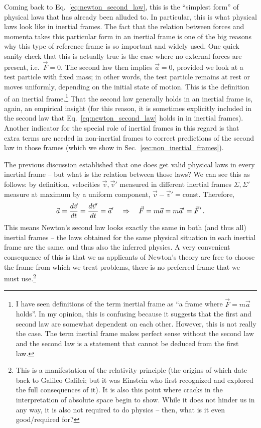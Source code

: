 \documentclass[../class_mech_main.tex]{subfiles}
\begin{document}
Coming back to Eq.~\eqref{eq:newton_second_law}, this is the \enquote{simplest form} of physical laws that has already been alluded to. In particular, this is what physical laws look like in inertial frames. The fact that the relation between forces and momenta takes this particular form in an inertial frame is one of the big reasons why this type of reference frame is so important and widely used. One quick sanity check that this is actually true is the case where no external forces are present, i.e.~$\vec{F} = 0$. The second law then implies $\vec{a} = 0$, provided we look at a test particle with fixed mass; in other words, the test particle remains at rest or moves uniformly, depending on the initial state of motion. This is the definition of an inertial frame.\footnote{I have seen definitions of the term inertial frame as \enquote{a frame where $\vec{F} = m \vec{a}$ holds}. In my opinion, this is confusing because it suggests that the first and second law are somewhat dependent on each other. However, this is not really the case. The term inertial frame makes perfect sense without the second law and the second law is a statement that cannot be deduced from the first law.} That the second law generally holds in an inertial frame is, again, an empirical insight (for this reason, it is sometimes explicitly included in the second law that Eq.~\eqref{eq:newton_second_law} holds in in inertial frames). Another indicator for the special role of inertial frames in this regard is that extra terms are needed in non-inertial frames to correct predictions of the second law in those frames (which we show in Sec.~\ref{sec:non_inertial_frames}).

The previous discussion established that one does get valid physical laws in every inertial frame -- but what is the relation between those laws?
We can see this as follows: by definition, velocities $\vec{v}, \vec{v}'$ measured in different inertial frames $\Sigma, \Sigma'$ measure at maximum by a uniform component, $\vec{v} - \vec{v}' = \text{const}$. Therefore,
\begin{equation}
	\vec{a} = \dv{\vec{v}}{t} = \dv{\vec{v}'}{t} = \vec{a}'
	\quad \Rightarrow \quad
	\vec{F} = m \vec{a} = m \vec{a}' = \vec{F}'
	\, .
\end{equation}
This means Newton's second law looks exactly the same in both (and thus all) inertial frames -- the laws obtained for the same physical situation in each inertial frame are the same, and thus also the inferred physics. A very convenient consequence of this is that we as applicants of Newton's theory are free to choose the frame from which we treat problems, there is no preferred frame that we must use.\footnote{This is a manifestation of the relativity principle (the origins of which date back to Galileo Galilei; but it was Einstein who first recognized and explored the full consequences of it). It is also this point where cracks in the interpretation of absolute space begin to show. While it does not hinder us in any way, it is also not required to do physics -- then, what is it even good/required for?}
\end{document}
